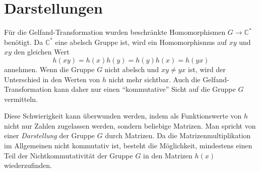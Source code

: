 %
%
%
\section{Darstellungen
\label{buch:gruppen:section:darstellung}}
Für die Gelfand-Transformation wurden beschränkte Homomorphismen
$G\to\mathbb{C}^*$ benötigt.
Da $\mathbb{C}^*$ eine abelsch Gruppe ist, wird ein Homomorphismus
auf $xy$ und $xy$ den gleichen Wert
\[
h(xy) = h(x)h(y) = h(y)h(x) = h(yx)
\]
annehmen.
Wenn die Gruppe $G$ nicht abelsch und $xy\ne yx$ ist, wird der
Unterschied in den Werten von $h$ nicht mehr sichtbar.
Auch die Gelfand-Transformation kann daher nur einen ``kommutative''
Sicht auf die Gruppe $G$ vermitteln.

Diese Schwierigkeit kann überwunden werden, indem als Funktionswerte
von $h$ nicht nur Zahlen zugelassen werden, sondern beliebige
Matrizen.
Man spricht von einer {\em Darstellung} der Gruppe $G$ durch
Matrizen.
Da die Matrizenmultiplikation im Allgemeinen nicht kommutativ
ist, besteht die Möglichkeit, mindestens einen Teil der
Nichtkommutativität der Gruppe $G$ in den Matrizen $h(x)$
wiederzufinden.













